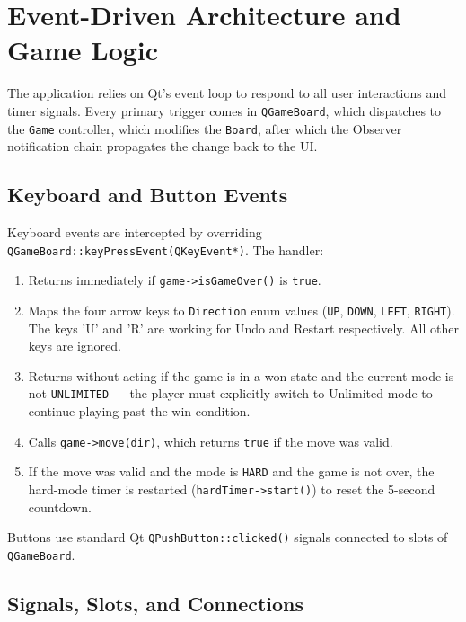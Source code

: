\documentclass[a4paper,12pt]{article}
\begin{document}
\section{Event-Driven Architecture and Game Logic}

The application relies on Qt's event loop to respond to all user interactions and timer signals. Every primary trigger comes in \texttt{QGameBoard}, which dispatches to the \texttt{Game} controller, which modifies the \texttt{Board}, after which the Observer notification chain propagates the change back to the UI.

\subsection{Keyboard and Button Events}

Keyboard events are intercepted by overriding \texttt{QGameBoard::keyPressEvent(QKeyEvent*)}. The handler:

\begin{enumerate}
    \item Returns immediately if \texttt{game->isGameOver()} is \texttt{true}.
    \item Maps the four arrow keys to \texttt{Direction} enum values (\texttt{UP}, \texttt{DOWN}, \texttt{LEFT}, \texttt{RIGHT}). The keys 'U' and 'R' are working for Undo and Restart respectively. All other keys are ignored.
    \item Returns without acting if the game is in a won state and the current mode is not \texttt{UNLIMITED} --- the player must explicitly switch to Unlimited mode to continue playing past the win condition.
    \item Calls \texttt{game->move(dir)}, which returns \texttt{true} if the move was valid.
    \item If the move was valid and the mode is \texttt{HARD} and the game is not over, the hard-mode timer is restarted (\texttt{hardTimer->start()}) to reset the 5-second countdown.
\end{enumerate}

Buttons use standard Qt \texttt{QPushButton::clicked()} signals connected to slots of \texttt{QGameBoard}. 

\subsection{Signals, Slots, and Connections}
\end{document}
